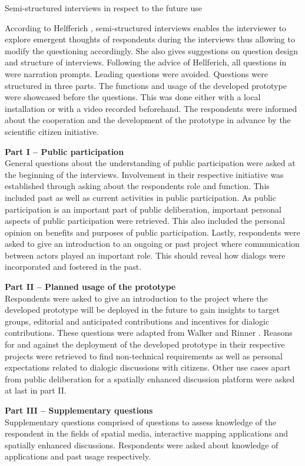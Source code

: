 Semi-structured interviews in respect to the future use

According to Helfferich \cite{helfferich2005}, semi-structured interviews enables the interviewer to explore emergent thoughts of respondents during the interviews thus allowing to modify the questioning accordingly.  She also gives suggestions on question design and structure of interviews. Following the advice of Hellferich, all questions in were narration prompts. Leading questions were avoided. Questions were structured in three parts. The functions and usage of the developed prototype were showcased before the questions. This was done either with a local installation or with a video recorded beforehand. The respondents were informed about the cooperation and the development of the prototype in advance by the scientific citizen initiative.

\textbf{Part I -- Public participation}\\
General questions about the understanding of public participation were asked at the beginning of the interviews. Involvement in their respective initiative was established through asking about the respondents role and function. This included past as well as current activities in public participation. As public participation is an important part of public deliberation, important personal aspects of public participation were retrieved. This also included the personal opinion on benefits and purposes of public participation. Lastly, respondents were asked to give an introduction to an ongoing or past project where communication between actors played an important role. This should reveal how dialogs were incorporated and fostered in the past.

\textbf{Part II -- Planned usage of the prototype}\\
Respondents were asked to give an introduction to the project where the developed prototype will be deployed in the future to gain insights to target groups, editorial and anticipated contributions and incentives for dialogic contributions. These questions were adapted from Walker and Rinner \cite{Walker2013Qualitative}. Reasons for and against the deployment of the developed prototype in their respective projects were retrieved to find non-technical requirements as well as personal expectations related to dialogic discussions with citizens. Other use cases apart from public deliberation for a spatially enhanced discussion platform were asked at last in part II.

\textbf{Part III -- Supplementary questions}\\
Supplementary questions comprised of questions to assess knowledge of the respondent in the fields of spatial media, interactive mapping applications and spatially enhanced discussions. Respondents were asked about knowledge of applications and past usage respectively.

